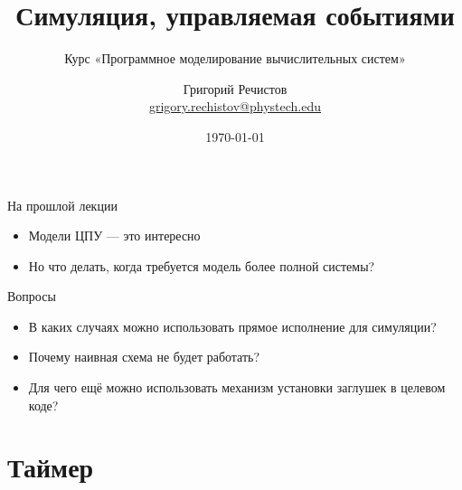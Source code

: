 \documentclass{beamer}
\title{Симуляция, управляемая событиями}
\subtitle{Курс «Программное моделирование вычислительных систем»}
\author[]{Григорий Речистов \\ \small{\href{mailto:grigory.rechistov@phystech.edu}{grigory.rechistov@phystech.edu}}}
\date{\today}
\begin{document}
\begin{frame}
    \maketitle
\end{frame}

\begin{frame}
    \tableofcontents
\end{frame}

\begin{frame}{На прошлой лекции}
\begin{itemize}
    \item Модели ЦПУ — это интересно
    \item Но что делать, когда требуется модель более полной системы?
\end{itemize}
\end{frame}

\begin{frame}{Вопросы}
\begin{itemize}
\item В каких случаях можно использовать прямое исполнение для симуляции?\pause
\item Почему наивная схема не будет работать?\pause
\item Для чего ещё можно использовать механизм установки заглушек в целевом коде?
\end{itemize}

\end{frame}


\section{Таймер}
\end{document}
